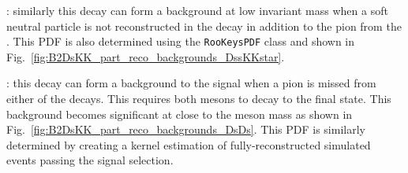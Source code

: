 
\begin{description}
\item \decay{\Bsb}{\Dssp\Km\Kstarz}: similarly this decay can form a background at low invariant mass when a soft neutral particle is not reconstructed in the  decay in addition to the pion from the \Kstarz. This PDF is also determined using the \texttt{RooKeysPDF} class and shown in Fig.~\ref{fig:B2DsKK_part_reco_backgrounds_DssKKstar}.
\end{description}


\begin{description}
\item \decay{\Bsb}{\Dsp\Dsm}: this decay can form a background to the signal when a pion is missed from either of the \Dsp decays. This requires both \Dsp mesons to decay to the \decay{\Dsp}{\Kp\Km\pip} final state. 
This background becomes significant at close to the \Bp meson mass as shown in Fig.~\ref{fig:B2DsKK_part_reco_backgrounds_DsDs}. 
This PDF is similarly determined by creating a kernel estimation of fully-reconstructed simulated events passing the signal selection.  
\end{description}

